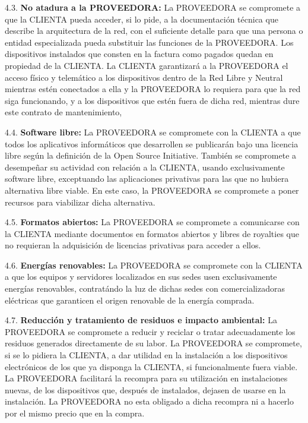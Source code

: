\documentclass[11pt,spanish,a4paper,]{article}
\begin{document}
4.3. \textbf{No atadura a la PROVEEDORA:} La PROVEEDORA se compromete a
que la CLIENTA pueda acceder, si lo pide, a la documentación técnica que
describe la arquitectura de la red, con el suficiente detalle para que
una persona o entidad especializada pueda substituir las funciones de la
PROVEEDORA. Los dispositivos instalados que consten en la factura como
pagados quedan en propiedad de la CLIENTA. La CLIENTA garantizará a la
PROVEEDORA el acceso físico y telemático a los dispositivos dentro de la
Red Libre y Neutral mientras estén conectados a ella y la PROVEEDORA lo
requiera para que la red siga funcionando, y a los dispositivos que
estén fuera de dicha red, mientras dure este contrato de mantenimiento,

4.4. \textbf{Software libre:} La PROVEEDORA se compromete con la CLIENTA
a que todos los aplicativos informáticos que desarrollen se publicarán
bajo una licencia libre según la definición de la Open Source
Initiative. También se compromete a desempeñar su actividad con relación
a la CLIENTA, usando exclusivamente software libre, exceptuando las
aplicaciones privativas para las que no hubiera alternativa libre
viable. En este caso, la PROVEEDORA se compromete a poner recursos para
viabilizar dicha alternativa.

4.5. \textbf{Formatos abiertos:} La PROVEEDORA se compromete a
comunicarse con la CLIENTA mediante documentos en formatos abiertos y
libres de royalties que no requieran la adquisición de licencias
privativas para acceder a ellos.

4.6. \textbf{Energías renovables:} La PROVEEDORA se compromete con la
CLIENTA a que los equipos y servidores localizados en sus sedes usen
exclusivamente energías renovables, contratándo la luz de dichas sedes
con comercializadoras eléctricas que garanticen el origen renovable de
la energía comprada.

4.7. \textbf{Reducción y tratamiento de residuos e impacto ambiental:}
La PROVEEDORA se compromete a reducir y reciclar o tratar adecuadamente
los residuos generados directamente de su labor. La PROVEEDORA se
compromete, si se lo pidiera la CLIENTA, a dar utilidad en la
instalación a los dispositivos electrónicos de los que ya disponga la
CLIENTA, si funcionalmente fuera viable. La PROVEEDORA facilitará la
recompra para su utilización en instalaciones nuevas, de los
dispositivos que, después de instalados, dejasen de usarse en la
instalación. La PROVEEDORA no esta obligado a dicha recompra ni a
hacerlo por el mismo precio que en la compra.
\end{document}

